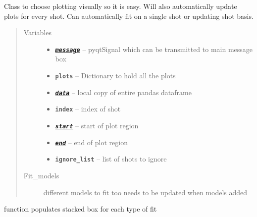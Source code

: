 \documentclass[letterpaper,10pt,english]{sphinxmanual}
\begin{document}
\begin{fulllineitems}
\label{VisualPlotter:Visualplotterwidget.VisualPlotter}
Class to choose plotting visually so it is easy.  Will also
automatically update plots for every shot.  Can automatically fit on a
single shot or updating shot basis.
\begin{quote}\begin{description}
\item[{Variables}] \leavevmode\begin{itemize}
\item {} 
{\hyperref[DataPlotsWidget:Dataplots.DataPlotsWidget.message]{\emph{\textbf{\texttt{message}}}}} -- pyqtSignal which can be transmitted to main message box

\item {} 
\textbf{\texttt{plots}} -- Dictionary to hold all the plots

\item {} 
{\hyperref[DataTableModel:Datatablewidget.DataTableModel.data]{\emph{\textbf{\texttt{data}}}}} -- local copy of entire pandas dataframe

\item {} 
\textbf{\texttt{index}} -- index of shot

\item {} 
{\hyperref[MainWindow:SpinorMonitor.MainWindow.start]{\emph{\textbf{\texttt{start}}}}} -- start of plot region

\item {} 
{\hyperref[MainWindow:SpinorMonitor.MainWindow.end]{\emph{\textbf{\texttt{end}}}}} -- end of plot region

\item {} 
\textbf{\texttt{ignore\_list}} -- list of shots to ignore

\end{itemize}

\item[{Fit\_models}] \leavevmode
different models to fit too needs to be updated when models added

\end{description}\end{quote}

\begin{fulllineitems}
\label{VisualPlotter:Visualplotterwidget.VisualPlotter.add_fitting_widgets}
function populates stacked box for each type of fit


\end{fulllineitems}
\end{fulllineitems}
\end{document}
